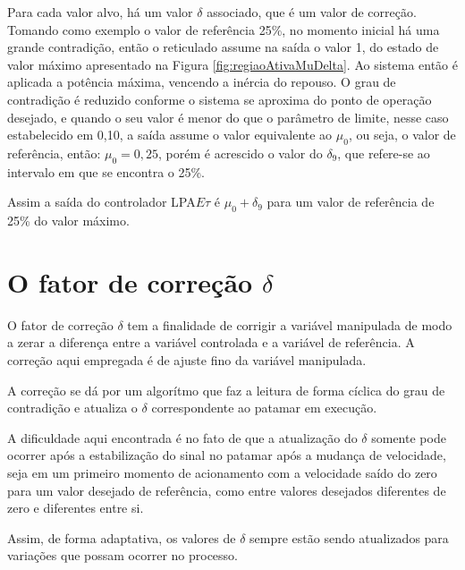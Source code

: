 Para cada valor alvo, há um valor $\delta$ associado, 
que é um valor de correção.
Tomando como exemplo o valor de referência 25\%, 
no momento inicial há uma grande contradição,
então o reticulado assume na saída o valor 1, 
do estado de valor máximo apresentado na 
Figura \ref{fig:regiaoAtivaMuDelta}.
Ao sistema então é aplicada a potência máxima, 
vencendo a inércia do repouso.
O grau de contradição é reduzido conforme 
o sistema se aproxima do ponto de operação desejado,
e quando o seu valor é menor do que 
o parâmetro de limite, nesse caso estabelecido em 0,10,
a saída assume o valor equivalente ao $\mu_0$, ou seja,
o valor de referência, então: $\mu_0 = 0,25$, porém 
é acrescido o valor do $\delta_9$, 
que refere-se ao intervalo em que se encontra o 25\%.

Assim a saída do controlador LPA$E\tau$ é 
$\mu_0 + \delta_9$
para um valor de referência de 25\% do valor máximo.









\section{O fator de correção $\delta$}

O fator de correção $\delta$ tem a finalidade de corrigir a variável
manipulada de modo a zerar a diferença entre a variável controlada e a
variável de referência. A correção aqui empregada é de ajuste fino da
variável manipulada.

A correção se dá por um algorítmo que faz a leitura de forma cíclica
do grau de contradição e atualiza o $\delta$ correspondente ao patamar
em execução.

A dificuldade aqui encontrada é no fato de que a atualização do
$\delta$ somente pode ocorrer após a estabilização do sinal no patamar
após a mudança de velocidade, seja em um primeiro momento de
acionamento com a velocidade saído do zero para um valor desejado de
referência, como entre valores desejados diferentes de zero e
diferentes entre si. 


Assim, de forma adaptativa, 
os valores de $\delta$ sempre estão sendo atualizados
para variações que possam ocorrer no processo. 





